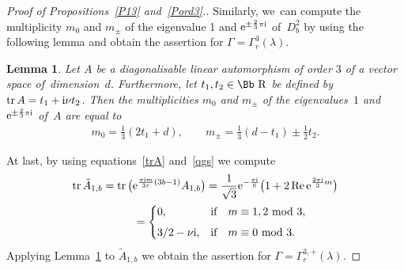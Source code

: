 \documentclass[10pt,a4paper]{amsart}
\newcommand\RR{{\mbox{\Bb R}}}
\newcommand{\tr}{\mathop{{\rm tr}}}
\renewcommand{\Re}{\mathop{{\rm Re}}}
\numberwithin{equation}{section}
\newtheorem{Lemma}[Theorem]{Lemma}
\begin{document}
\begin{proof}[Proof of Propositions~\ref{P13} and~\ref{Pord3}.]
Similarly, we~can compute the multiplicity $m_0$ and $m_\pm$ of the eigenvalue 1 and ${\rm e}^{\pm\frac{2}{3}\pi {\rm i}}$ of~$D_b^2$ by using the following lemma and obtain the assertion for $\Gamma=\Gamma^3_r(\lambda)$.
\begin{Lemma}\label{LD3}
Let $A$ be a diagonalisable linear automorphism of order $3$ of a vector space of~dimension~$d$. Furthermore, let $t_1,t_2\in \RR$ be defined by $\tr A= t_1+{\rm i}\nu t_2$.
Then the multiplicities $m_0$ and $m_\pm$ of the eigenvalues~$1$ and ${\rm e}^{\pm\frac{2}{3}\pi {\rm i}}$ of~$A$ are equal to
\begin{gather*}
m_0 = \frac{1}{3}(2t_1+d),\qquad
m_\pm = \frac{1}{3}(d-t_1)\pm\frac{1}{2}t_2.
\end{gather*}
\end{Lemma}

At last, by using equations~\eqref{trA} and~\eqref{qgs} we compute
\begin{gather*}
\tr \tilde A_{1,b}= \tr \big({\rm e}^{\frac{\pi {\rm i}m}{3r}(3b-1)} A_{1,b}\big)
= \frac1{\sqrt 3}{\rm e}^{-\frac{\pi {\rm i}}6}\big(1+2\Re {\rm e}^{\frac{2\pi {\rm i}}3 m}\big)
\\ \hphantom{\tr \tilde A_{1,b}}
{}=\begin{cases}
0, &\text{if}\quad m\equiv 1,2\ {\rm mod}\ 3,
\\[1ex]
{3}/{2}-\nu {\rm i}, &\text{if}\quad m\equiv 0\ {\rm mod}\ 3.
\end{cases}
\end{gather*}
Applying Lemma~\ref{LD3} to $\tilde A_{1,b}$ we obtain the assertion for $\Gamma=\Gamma^{3,+}_r(\lambda)$.
\end{proof}
\end{document}
